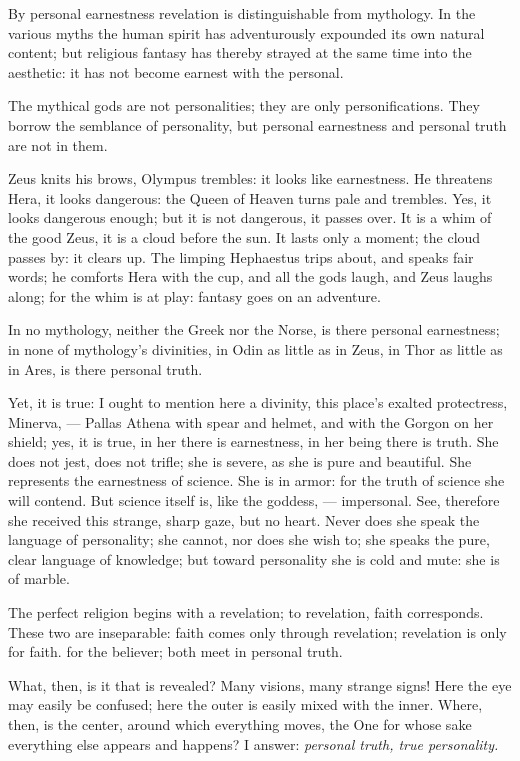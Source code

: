 \documentclass[12pt,a4paper]{book}
\begin{document}
By personal earnestness revelation is distinguishable from mythology. In the various myths the human spirit has adventurously expounded its own natural content; but religious fantasy has thereby strayed at the same time into the aesthetic: it has not become earnest with the personal.

The mythical gods are not personalities; they are only personifications. They borrow the semblance of personality, but personal earnestness and personal truth are not in them.

Zeus knits his brows, Olympus trembles: it looks like earnestness. He threatens Hera, it looks dangerous: the Queen of Heaven turns pale and trembles. Yes, it looks dangerous enough; but it is not dangerous, it passes over. It is a whim of the good Zeus, it is a cloud before the sun. It lasts only a moment; the cloud passes by: it clears up. The limping Hephaestus trips about, and speaks fair words; he comforts Hera with the cup, and all the gods laugh, and Zeus laughs along; for the whim is at play: fantasy goes on an adventure.

In no mythology, neither the Greek nor the Norse, is there personal earnestness; in none of mythology's
divinities, in Odin as little as in Zeus, in Thor as little as in Ares, is there personal truth.

Yet, it is true: I ought to mention here a divinity, this place's exalted protectress, Minerva, --- Pallas Athena with spear and helmet, and with the Gorgon on her shield; yes, it is true, in her there is earnestness, in her being there is truth. She does not jest, does not trifle; she is severe, as she is pure and beautiful. She represents the earnestness of science. She is in armor: for the truth of science she will contend. But science itself is, like the goddess, --- impersonal. See, therefore she received this strange, sharp gaze, but no heart. Never does she speak the language of personality; she cannot, nor does she wish to; she speaks the pure, clear language of knowledge; but toward personality she is cold and mute: she is of marble.

The perfect religion begins with a revelation; to revelation, faith corresponds. These two are inseparable: faith comes only through revelation; revelation is only for faith. for the believer; both meet in personal truth.

What, then, is it that is revealed? Many visions, many strange signs! Here the eye may easily be confused; here the outer is easily mixed with the inner. Where, then, is the center, around which everything moves, the One for whose sake everything else appears and happens? I answer: \emph{personal truth, true personality.}
\end{document}
